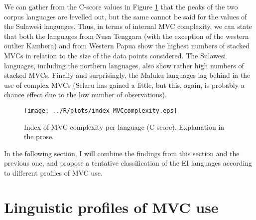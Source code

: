 We can gather from the C-score values in Figure \ref{fig:complexity} that the peaks of the two corpus languages are levelled out, but the same cannot be said for the values of the Sulawesi languages. Thus, in terms of internal MVC complexity, we can state that both the languages from Nusa Tenggara (with the exception of the western outlier Kambera) and from Western Papua show the highest numbers of stacked MVCs in relation to the size of the data points considered. The Sulawesi languages, including the northern languages, also show rather high numbers of stacked MVCs. Finally and surprisingly, the Maluku languages lag behind in the use of complex MVCs (Selaru has gained a little, but this, again, is probably a chance effect due to the low number of observations). 

\begin{figure}
\texttt{[image: ../R/plots/index\_MVCcomplexity.eps]}
\caption[Index of MVC complexity per language]{Index of MVC complexity per language (C-score). Explanation in the prose.}\label{fig:complexity}
\end{figure}
 

In the following section, I will combine the findings from this section and the previous one, and propose a tentative classification of the EI languages according to different profiles of MVC use.

\section{Linguistic profiles of MVC use} \label{sec:profile_use}

